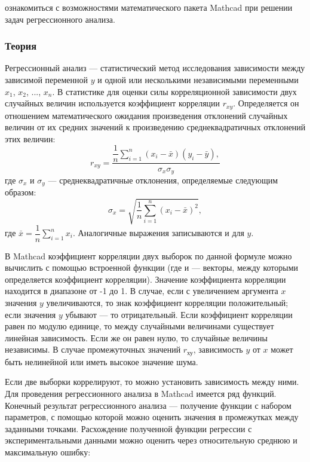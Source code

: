 
\goal ознакомиться с возможностями математического пакета Mathcad при решении задач регрессионного анализа. 

\subsubsection*{Теория}
Регрессионный анализ --- статистический метод исследования зависимости между зависимой переменной $y$ и одной или несколькими независимыми переменными $x_1$, $x_2$, $...$, $x_n$.
В статистике для оценки силы корреляционной зависимости двух случайных величин используется коэффициент корреляции $r_{xy}$. Определяется он отношением математического ожидания произведения отклонений случайных величин от их средних значений к произведению среднеквадратичных отклонений этих величин:
\begin{equation}
r_{xy}=\dfrac{\dfrac{1}{n} \sum\limits_{i=1}^{n} (x_i-\bar{x}) (y_i-\bar{y}), }{\sigma_x \sigma_y}
\end{equation}
где $\sigma_x$ и $\sigma_y$ --- среднеквадратичные отклонения, определяемые следующим образом:
\begin{equation}
\sigma_x=\sqrt{\dfrac{1}{n} \sum\limits_{i=1}^{n}(x_i-\bar{x})^2},
\end{equation}
где $\bar{x}=\dfrac{1}{n} \sum\limits_{i=1}^{n} x_i$.
Аналогичные выражения записываются и для $y$.

В Mathcad коэффициент корреляции двух выборок по данной формуле можно вычислить с помощью встроенной функции  (где  и  --- векторы, между которыми определяется коэффициент корреляции). Значение коэффициента корреляции находится в диапазоне от -1 до 1. В случае, если с увеличением аргумента $x$  значения $y$ увеличиваются, то знак коэффициент корреляции положительный; если значения $y$ убывают --- то отрицательный. Если коэффициент корреляции равен по модулю единице, то между случайными величинами существует линейная зависимость. Если же он равен нулю, то случайные величины независимы. В случае промежуточных значений $r_{ху}$, зависимость $y$ от $x$ может быть нелинейной или иметь высокое значение шума.

Если две выборки коррелируют, то можно установить зависимость между ними. Для проведения регрессионного анализа в Mathcad имеется ряд функций. Конечный результат регрессионного анализа --- получение функции с набором параметров, с помощью которой можно оценить значения в промежутках между заданными точками. Расхождение полученной функции регрессии с экспериментальными данными можно оценить через относительную среднюю и максимальную ошибку:

